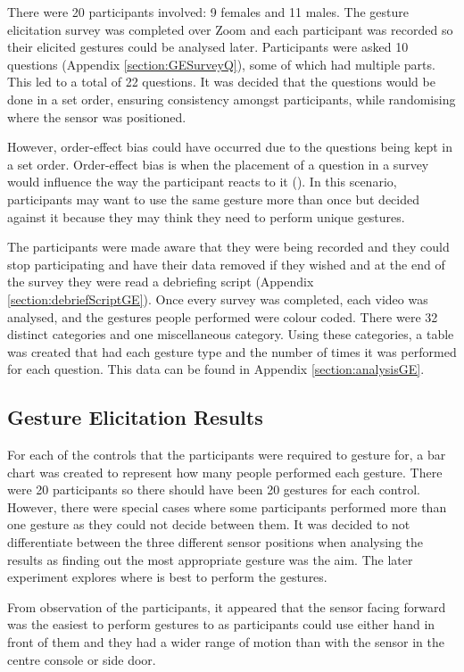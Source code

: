 \documentclass{l4proj}
\begin{document}
There were 20 participants involved: 9 females and 11 males. The gesture elicitation survey was completed over Zoom and each participant was recorded so their elicited gestures could be analysed later. Participants were asked 10 questions (Appendix \ref{section:GESurveyQ}), some of which had multiple parts. This led to a total of 22 questions. It was decided that the questions would be done in a set order, ensuring consistency amongst participants, while randomising where the sensor was positioned. 

However, order-effect bias could have occurred due to the questions being kept in a set order. Order-effect bias is when the placement of a question in a survey would influence the way the participant reacts to it (\cite{Perreault_1975}). In this scenario, participants may want to use the same gesture more than once but decided against it because they may think they need to perform unique gestures.

The participants were made aware that they were being recorded and they could stop participating and have their data removed if they wished and at the end of the survey they were read a debriefing script (Appendix \ref{section:debriefScriptGE}).
Once every survey was completed, each video was analysed, and the gestures people performed were colour coded. There were 32 distinct categories and one miscellaneous category. Using these categories, a table was created that had each gesture type and the number of times it was performed for each question. This data can be found in Appendix \ref{section:analysisGE}.


\subsection{Gesture Elicitation Results}
\label{subsection:gestureElicitOne}
For each of the controls that the participants were required to gesture for, a bar chart was created to represent how many people performed each gesture. There were 20 participants so there should have been 20 gestures for each control. However, there were special cases where some participants performed more than one gesture as they could not decide between them. It was decided to not differentiate between the three different sensor positions when analysing the results as finding out the most appropriate gesture was the aim. The later experiment explores where is best to perform the gestures. 

From observation of the participants, it appeared that the sensor facing forward was the easiest to perform gestures to as participants could use either hand in front of them and they had a wider range of motion than with the sensor in the centre console or side door. 
\end{document}
